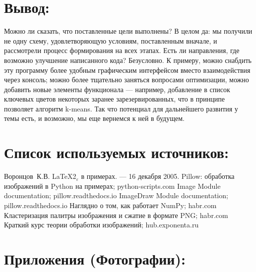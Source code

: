 \documentclass[12pt]{article}
\begin{document}
{		
	
	\section{Вывод:}
	
	Можно ли сказать, что поставленные цели выполнены? В целом да: мы получили не одну схему, удовлетворяющую условиям, поставленным вначале, и рассмотрели процесс формирования на всех этапах. Есть ли направления, где возможно улучшение написанного кода? Безусловно. К примеру, можно снабдить эту программу более удобным графическим интерфейсом вместо взаимодействия через консоль; можно более тщательно заняться вопросами оптимизации, можно добавить новые элементы функционала --- например, добавление в список ключевых цветов некоторых заранее зарезервированных, что в принципе позволяет алгоритм k-means. Так что потенциал для дальнейшего развития у темы есть, и возможно, мы еще вернемся к ней в будущем.
	
	
	\section{Список используемых источников:}
	
	\begin{thebibliography}{99}
		 Воронцов~К.В. \LaTeX 2$_\varepsilon$ в примерах.
		--- 16 декабря 2005.
		 Pillow: обработка изображений в Python на примерах; python-scripts.com
		 Image Module documentation; pillow.readthedocs.io
		 ImageDraw Module documentation; pillow.readthedocs.io
		 Наглядно о том, как работает NumPy; habr.com
		 Кластеризация палитры изображения и сжатие в формате PNG; habr.com
		 Краткий курс теории обработки изображений; hub.exponenta.ru
	\end{thebibliography}
	
	\section{Приложения (Фотографии):}
	\label{assets}
	
}
\end{document}

